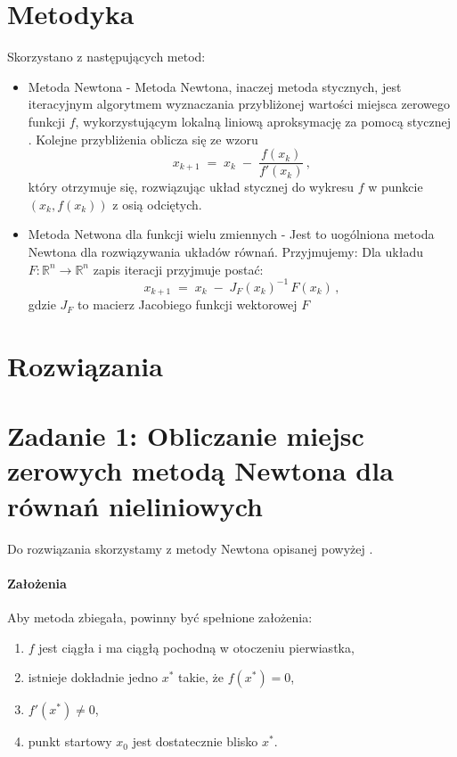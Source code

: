 \documentclass[a4paper,12pt]{article}
\begin{document}
\section{Metodyka}

Skorzystano z następujących metod:
\begin{itemize}
    \item Metoda Newtona - Metoda Newtona, inaczej metoda stycznych, jest iteracyjnym algorytmem wyznaczania przybliżonej wartości miejsca zerowego funkcji \(f\), wykorzystującym lokalną liniową aproksymację za pomocą stycznej \cite{wiki:Metoda_Newtona}. Kolejne przybliżenia oblicza się ze wzoru
\[
  x_{k+1} \;=\; x_k \;-\;\frac{f(x_k)}{f'(x_k)}\,,
\]
który otrzymuje się, rozwiązując układ stycznej do wykresu \(f\) w punkcie \((x_k,f(x_k))\) z osią odciętych.
    \item Metoda Netwona dla funkcji wielu zmiennych - Jest to uogólniona metoda Newtona dla rozwiązywania układów równań. Przyjmujemy:
    Dla układu \(F:\mathbb R^n\to\mathbb R^n\) zapis iteracji przyjmuje postać:
\[
  x_{k+1} \;=\; x_k \;-\;J_F(x_k)^{-1}\,F(x_k)\,,
\]
gdzie \(J_F\) to macierz Jacobiego funkcji wektorowej \(F\) \cite{wiki:Metoda_Newtona}

\end{itemize}

\section{Rozwiązania}

\section*{Zadanie 1: Obliczanie miejsc zerowych metodą Newtona dla równań nieliniowych}

Do rozwiązania skorzystamy z metody Newtona opisanej powyżej \cite{wiki:Metoda_Newtona}. 

\paragraph{Założenia}
Aby metoda zbiegała, powinny być spełnione założenia:
\begin{enumerate}
  \item \(f\) jest ciągła i ma ciągłą pochodną w otoczeniu pierwiastka,
  \item istnieje dokładnie jedno \(x^*\) takie, że \(f(x^*)=0\),
  \item \(f'(x^*)\neq0\),
  \item punkt startowy \(x_0\) jest dostatecznie blisko \(x^*\).
\end{enumerate}
\end{document}
